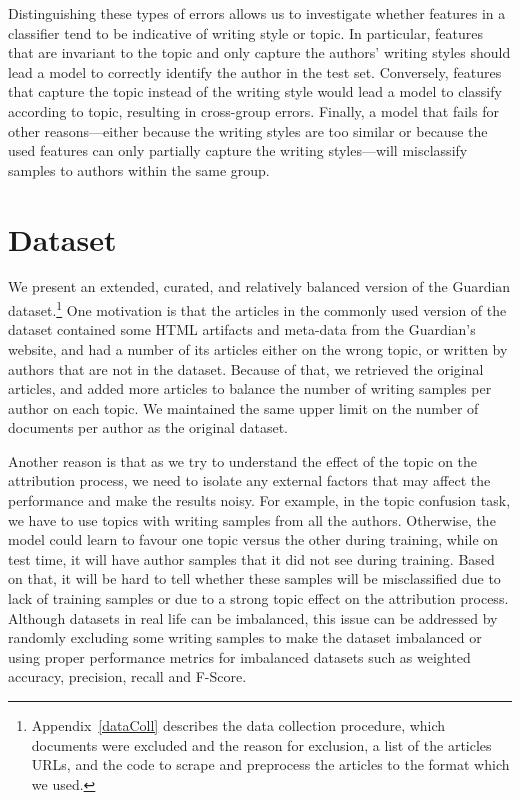 \documentclass[11pt]{article}
\begin{document}
Distinguishing these types of errors allows us to investigate whether features in a classifier tend to be indicative of writing style or topic. In particular, features that are invariant to the topic and only capture the authors' writing styles should lead a model to correctly identify the author in the test set. Conversely, features that capture the topic instead of the writing style would lead a model to classify according to topic, resulting in cross-group errors. Finally, a model that fails for other reasons---either because the writing styles are too similar or because the used features can only partially capture the writing styles---will misclassify samples to authors within the same group.


\section{Dataset\label{subsec:dataset}}
We present an extended, curated, and relatively balanced version of the Guardian dataset.\footnote{Appendix~\ref{dataColl} describes the data collection procedure, which documents were excluded and the reason for exclusion, a list of the articles URLs, and the code to scrape and preprocess the articles to the format which we used.} 
One motivation is that the articles in the commonly used version of the dataset contained some HTML artifacts and meta-data from the Guardian's website, and had a number of its articles either on the wrong topic, or written by authors that are not in the dataset. Because of that, we retrieved the original articles, and added more articles to balance the number of writing samples per author on each topic. We maintained the same upper limit on the number of documents per author as the original dataset.

Another reason is that as we try to understand the effect of the topic on the attribution process, we need to isolate any external factors that may affect the performance and make the results noisy. For example, in the topic confusion task, we have to use topics with writing samples from all the authors. Otherwise, the model could learn to favour one topic versus the other during training, while on test time, it will have author samples that it did not see during training. Based on that, it will be hard to tell whether these samples will be misclassified due to lack of training samples or due to a strong topic effect on the attribution process. Although datasets in real life can be imbalanced, this issue can be addressed by randomly excluding some writing samples to make the dataset imbalanced or using proper performance metrics for imbalanced datasets such as weighted accuracy, precision, recall and F-Score. 
\end{document}
